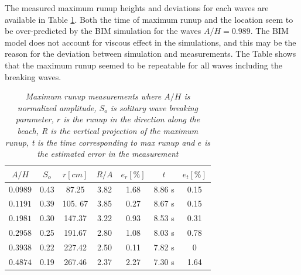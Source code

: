 \documentclass[a4paper, 11pt, english, twoside, openright]{article}
\begin{document}
The measured maximum runup heights and deviations for each waves are available in Table \ref{tab:max_shore}. Both the time of maximum runup and the location seem to be over-predicted by the BIM simulation for the waves $A/H=0.989$. The BIM model does not account for viscous effect in the simulations, and this may be the reason for the deviation between simulation and measurements. The Table shows that the maximum runup seemed to be repeatable for all waves including the breaking waves. %
\begin{table}[]
\caption{\textit{Maximum runup measurements where $A/H$ is normalized amplitude, $S_o $ is \citep{grilli1997breaking} solitary wave breaking parameter, $r$ is the runup in the direction along the beach, R is the vertical projection of the maximum runup, t is the time corresponding to max runup and $e$ is the estimated error in the measurement }}
\centering
\begin{tabular}{ccccccc}
\hline
         $A/H$& \textbf{$S_o$}     & $r [cm]$ &$R/A$ & $e_r [\%]$ & $t$ & $e_t [\%]$ \\ \hline
\textit{$0.0989$} &0.43 & 87.25    &    3.82  & 1.68             & 8.86 s        & 0.15               \\
\textit{$0.1191$} &0.39 & 105. 67   &    3.85   & 0.27             & 8.67 s        & 0.15               \\
\textit{$0.1981$} &0.30 & 147.37    &    3.22  & 0.93            & 8.53 s        & 0.31                \\
\textit{$0.2958$} &0.25 & 191.67     &   2.80  & 1.08           & 8.03 s        & 0.78              \\
\textit{$0.3938$} &0.22 & 227.42      &   2.50 & 0.11            & 7.82 s        & 0              \\
\textit{$0.4874$} &0.19 & 267.46       &    2.37 & 2.27            & 7.30 s        & 1.64              
\end{tabular}
\label{tab:max_shore}
\end{table}
\end{document}
